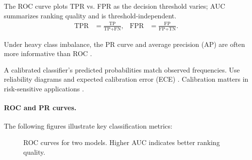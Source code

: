\begin{definition}
The ROC curve  plots TPR vs. FPR as the decision threshold varies; AUC summarizes ranking quality and is threshold-independent.
\begin{align}
\text{TPR} &= \frac{\text{TP}}{\text{TP} + \text{FN}}, & \text{FPR} &= \frac{\text{FP}}{\text{FP} + \text{TN}}.
\end{align}
\end{definition}

\begin{definition}
Under heavy class imbalance, the PR curve  and average precision (AP) are often more informative than ROC \textcite{Prince2023}.
\end{definition}

\begin{definition}[Calibration]
A calibrated classifier's predicted probabilities match observed frequencies. Use reliability diagrams and expected calibration error (ECE) . Calibration matters in risk-sensitive applications \textcite{GoodfellowEtAl2016}.
\end{definition}



\paragraph{ROC and PR curves.} The following figures illustrate key classification metrics:

\begin{figure}[ht]
  \centering
  \caption{ROC curves for two models. Higher AUC indicates better ranking quality.}
  \label{fig:roc-curves}
\end{figure}

